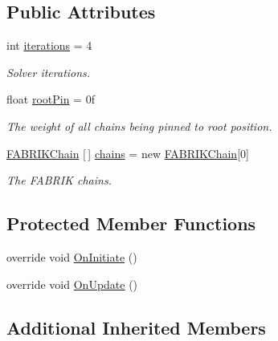 \subsection*{Public Attributes}
\begin{DoxyCompactItemize}
\item 
int \mbox{\hyperlink{class_root_motion_1_1_final_i_k_1_1_i_k_solver_f_a_b_r_i_k_root_a3b662ef787c8292122c22652724e5f61}{iterations}} = 4
\begin{DoxyCompactList}\small\item\em Solver iterations. \end{DoxyCompactList}\item 
float \mbox{\hyperlink{class_root_motion_1_1_final_i_k_1_1_i_k_solver_f_a_b_r_i_k_root_a141f80e93f162d09807900b2aeb1e40c}{root\+Pin}} = 0f
\begin{DoxyCompactList}\small\item\em The weight of all chains being pinned to root position. \end{DoxyCompactList}\item 
\mbox{\hyperlink{class_root_motion_1_1_final_i_k_1_1_f_a_b_r_i_k_chain}{F\+A\+B\+R\+I\+K\+Chain}} \mbox{[}$\,$\mbox{]} \mbox{\hyperlink{class_root_motion_1_1_final_i_k_1_1_i_k_solver_f_a_b_r_i_k_root_ad3e855d0443097a275c9d6cd765429bc}{chains}} = new \mbox{\hyperlink{class_root_motion_1_1_final_i_k_1_1_f_a_b_r_i_k_chain}{F\+A\+B\+R\+I\+K\+Chain}}\mbox{[}0\mbox{]}
\begin{DoxyCompactList}\small\item\em The F\+A\+B\+R\+IK chains. \end{DoxyCompactList}\end{DoxyCompactItemize}
\subsection*{Protected Member Functions}
\begin{DoxyCompactItemize}
\item 
override void \mbox{\hyperlink{class_root_motion_1_1_final_i_k_1_1_i_k_solver_f_a_b_r_i_k_root_aff0059cd604e4b24bece3d9f6ba93837}{On\+Initiate}} ()
\item 
override void \mbox{\hyperlink{class_root_motion_1_1_final_i_k_1_1_i_k_solver_f_a_b_r_i_k_root_ad838b3cfe7d89cada478ca29d484eb6c}{On\+Update}} ()
\end{DoxyCompactItemize}
\subsection*{Additional Inherited Members}


